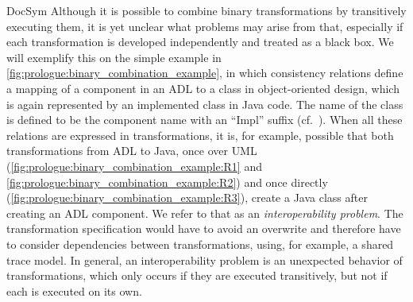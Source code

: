 \begin{copiedFrom}{DocSym}
Although it is possible to combine binary transformations by transitively executing them, it is yet unclear what problems may arise from that, especially if each transformation is developed independently and treated as a black box.
We will exemplify this on the simple example in \autoref{fig:prologue:binary_combination_example}, in which consistency relations define a mapping of a component in an \ac{ADL} to a class in object-oriented design, which is again represented by an implemented class in Java code. 
The name of the class is defined to be the component name with an \enquote{Impl} suffix (cf.~\cite{langhammer2017a}).
When all these relations are expressed in transformations, it is, for example, possible that both transformations from \ac{ADL} to Java, once over \ac{UML} (\ref{fig:prologue:binary_combination_example:R1} and \ref{fig:prologue:binary_combination_example:R2}) and once directly (\ref{fig:prologue:binary_combination_example:R3}), create a Java class after creating an \ac{ADL} component.
We refer to that as an \emph{interoperability problem}.
The transformation specification %
would have to avoid an overwrite and therefore have to consider dependencies between transformations, using, for example, a shared trace model.
In general, an interoperability problem is an unexpected behavior of transformations, which only occurs if they are executed transitively, but not if each is executed on its own. %


\end{copiedFrom}
